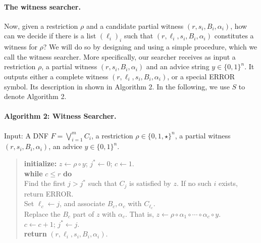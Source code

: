 \paragraph{The witness searcher.} Now, given a restriction $\rho$ and a candidate partial witness $(r,s_i,B_i,\alpha_i)$, how can we decide if there is a list $(\ell_i)_i$ such that $(r,\ell_i,s_i,B_i,\alpha_i)$ constitutes a witness for $\rho$? We will do so by designing and using a simple procedure, which we call the witness searcher. More specifically, our searcher receives as input a restriction $\rho$, a partial witness $(r,s_i,B_i,\alpha_i)$ and an advice string $y\in\{0,1\}^n$. It outputs either a complete witness $(r,\ell_i,s_i,B_i,\alpha_i)$, or a special ERROR symbol. Its description in shown in Algorithm 2. In the following, we use $S$ to denote Algorithm 2.
\paragraph{Algorithm 2: Witness Searcher.} Input: A DNF $F=\bigvee_{i=1}^mC_i$, a restriction $\rho\in\{0,1,\star\}^n$, a partial witness $(r,s_i,B_i,\alpha_i)$, an advice $y\in\{0,1\}^n$.
\begin{quote}\textbf{initialize:} $z\leftarrow\rho\circ y$; $j^*\leftarrow0$; $c\leftarrow1$.\\
\textbf{while} $c\le r$ \textbf{do}\\
\hspace*{1em}Find the first $j>j^*$ such that $C_j$ is satisfied by $z$. If no such $i$ exists, return ERROR.\\
\hspace*{1em}Set $\ell_c\leftarrow j$, and associate $B_c,\alpha_c$ with $C_{\ell_c}$.\\
\hspace*{1em}Replace the $B_c$ part of $z$ with $\alpha_c$. That is, $z\leftarrow\rho\circ\alpha_1\circ\cdots\circ\alpha_c\circ y$.\\
\hspace*{1em}$c\leftarrow c+1$; $j^*\leftarrow j$.\\
\textbf{return} $(r,\ell_i,s_i,B_i,\alpha_i)$.\end{quote}
